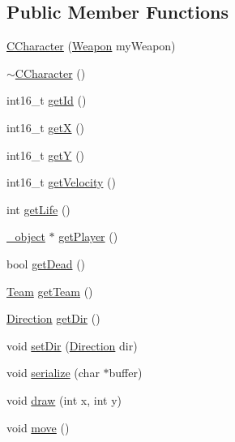 \subsection*{Public Member Functions}
\begin{DoxyCompactItemize}
\item 
\hyperlink{class_c_character_add20c9a63c5c11e8c0919e536d7636a2}{C\+Character} (\hyperlink{_enums_8hpp_ad9700e9db9d62004af4a04e4e13912c5}{Weapon} my\+Weapon)
\item 
\hyperlink{class_c_character_a8f8fb8991776a6b6a49c796e79968c91}{$\sim$\+C\+Character} ()
\item 
int16\+\_\+t \hyperlink{class_c_character_a317ea948f11c20c52b4eb915cbc6fd34}{get\+Id} ()
\item 
int16\+\_\+t \hyperlink{class_c_character_a27ef2164eae8c8858de7e22b8ae2b356}{get\+X} ()
\item 
int16\+\_\+t \hyperlink{class_c_character_a39af09fa51d180f49a58ffce78c9f25b}{get\+Y} ()
\item 
int16\+\_\+t \hyperlink{class_c_character_a7074f3d5a24d61766ce4d2fe354679ee}{get\+Velocity} ()
\item 
int \hyperlink{class_c_character_ae2e0ce8242ccb114248134e7d233fe80}{get\+Life} ()
\item 
\hyperlink{struct__object}{\+\_\+object} $\ast$ \hyperlink{class_c_character_af910f0944a8ba3afc92800fb696b7750}{get\+Player} ()
\item 
bool \hyperlink{class_c_character_aba453c8974f67b9a8621a63960263874}{get\+Dead} ()
\item 
\hyperlink{_enums_8hpp_a9c13bb5b1d69698f9b47900990eaa598}{Team} \hyperlink{class_c_character_a91ff320369ed4985b1c4b1762ce4fd9c}{get\+Team} ()
\item 
\hyperlink{_enums_8hpp_a224b9163917ac32fc95a60d8c1eec3aa}{Direction} \hyperlink{class_c_character_a367a85d8da544c05088712def127bf43}{get\+Dir} ()
\item 
void \hyperlink{class_c_character_a23914035239a49f1a2ce26248ce181f7}{set\+Dir} (\hyperlink{_enums_8hpp_a224b9163917ac32fc95a60d8c1eec3aa}{Direction} dir)
\item 
void \hyperlink{class_c_character_a2a9cb3e98cfe4c36ea292cdc38b999d8}{serialize} (char $\ast$buffer)
\item 
void \hyperlink{class_c_character_a80e38c97bd4d4fd9b7f017ec121f03a9}{draw} (int x, int y)
\item 
void \hyperlink{class_c_character_ad602f6042aeb6e500393bca375c4133b}{move} ()
\item 

\end{DoxyCompactItemize}
